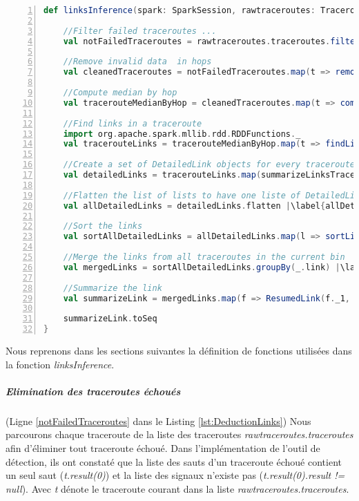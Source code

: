 \begin{lstlisting}[language=scala,firstnumber=1, caption={Deduction des liens par groupe de traceroutes},label={lst:DeductionLinks}, basicstyle = \footnotesize,escapechar=|,numbers=left,
stepnumber=1]
 def linksInference(spark: SparkSession, rawtraceroutes: TraceroutesPerPeriod): Seq[ResumedLink] = {
	
	//Filter failed traceroutes ... 
	val notFailedTraceroutes = rawtraceroutes.traceroutes.filter(t => t.result(0).result != null) |\label{notFailedTraceroutes}|
	
	//Remove invalid data  in hops
	val cleanedTraceroutes = notFailedTraceroutes.map(t => removeInvalidSignals(t)) |\label{cleanedTraceroutes}|
	
	//Compute median by hop
	val tracerouteMedianByHop = cleanedTraceroutes.map(t => computeMedianRTTByhop(t)) |\label{tracerouteMedianByHopline}|
	
	//Find links in a traceroute
	import org.apache.spark.mllib.rdd.RDDFunctions._
	val tracerouteLinks = tracerouteMedianByHop.map(t => findLinksAndRttDiffByTraceroute(spark, t)) |\label{tracerouteLinksline}|
	
	//Create a set of DetailedLink objects for every traceroute
	val detailedLinks = tracerouteLinks.map(summarizeLinksTraceroute) |\label{liens-par-périodeline}|
	
	//Flatten the list of lists to have one liste of DetailedLink objects
	val allDetailedLinks = detailedLinks.flatten |\label{allDetailedLinksFlattenline}|
	
	//Sort the links
	val sortAllDetailedLinks = allDetailedLinks.map(l => sortLinks(l)) |\label{sortAllDetailedLinksline}|
	
	//Merge the links from all traceroutes in the current bin
	val mergedLinks = sortAllDetailedLinks.groupBy(_.link) |\label{mergedLinksline}|
	
	//Summarize the link 
	val summarizeLink = mergedLinks.map(f => ResumedLink(f._1, f._2.map(_.probe), f._2.map(_.rttDiff), generateDatesSample(f._2.size, rawtraceroutes.timeWindow)))  |\label{summarizeLinkline}|
	
	summarizeLink.toSeq    
}
\end{lstlisting}


Nous reprenons dans les sections suivantes la définition de fonctions utilisées dans la fonction \textit{linksInference}.

\subparagraph{Elimination des traceroutes échoués} (Ligne \ref{notFailedTraceroutes} dans le Listing \ref{lst:DeductionLinks}) Nous parcourons chaque traceroute de la liste des traceroutes \textit{rawtraceroutes.traceroutes} afin d'éliminer tout traceroute échoué. Dans l'implémentation de l'outil de détection, ils ont constaté que la liste des sauts d'un traceroute échoué contient un seul saut (\textit{t.result(0)}) et la liste des signaux n'existe pas (\textit{t.result(0).result != null}). Avec \textit{t} dénote le traceroute courant dans la liste \textit{rawtraceroutes.traceroutes}. 


